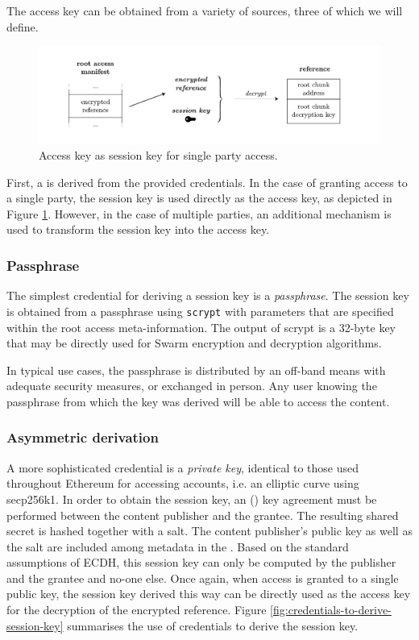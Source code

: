 The access key can be obtained from a variety of sources, three of which we will define.

\begin{figure}[htbp]
\centering
\includegraphics[width=\textwidth]{fig/access-control-single-party.pdf}
\caption[Access key as session key for single party access  \statusyellow]{Access key as session key for single party access.}
\label{fig:access-control-single-party}
\end{figure}

First, a  is derived from the provided credentials. In the case of granting access to a single party, the session key is used directly as the access key, as depicted in Figure \ref{fig:access-control-single-party}. However, in the case of multiple parties, an additional mechanism is used to transform the session key into the access key.

\subsubsection{Passphrase}
The simplest credential for deriving a session key is a \emph{passphrase}. The session key is obtained from a passphrase using \lstinline{scrypt} with parameters that are specified within the root access meta-information. The output of scrypt is a 32-byte key that may be directly used for Swarm encryption and decryption algorithms.

In typical use cases, the passphrase is distributed by an off-band means with adequate security measures, or exchanged in person. Any user knowing the passphrase from which the key was derived will be able to access the content.

\subsubsection{Asymmetric derivation}

A more sophisticated credential is a \emph{private key}, identical to those used throughout Ethereum for accessing accounts, i.e. an  elliptic curve using secp256k1. In order to obtain the session key, an  () key agreement must be performed between the content publisher and the grantee. The resulting shared secret is hashed together with a salt. The content publisher's public key as well as the salt are included among metadata in the . Based on the standard assumptions of ECDH, this session key can only be computed by the publisher and the grantee and no-one else. 
Once again, when access is granted to a single public key, the session key derived this way can be directly used as the access key for the decryption of the encrypted reference. 
Figure \ref{fig:credentials-to-derive-session-key} summarises the use of credentials to derive the session key.

